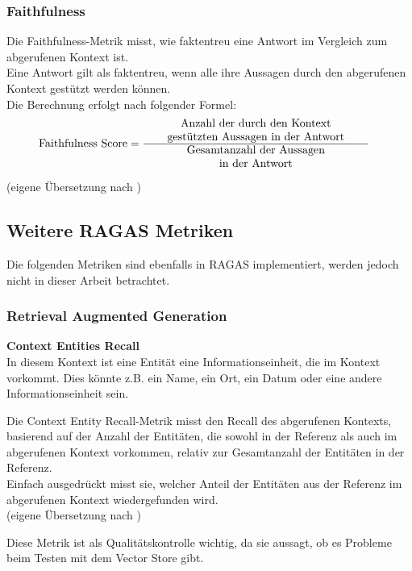 \subsubsection{Faithfulness}
\begin{plainquote}
Die Faithfulness-Metrik misst, wie faktentreu eine Antwort im Vergleich zum abgerufenen Kontext ist.\\

Eine Antwort gilt als faktentreu, wenn alle ihre Aussagen durch den abgerufenen Kontext gestützt werden können.\\

Die Berechnung erfolgt nach folgender Formel:
\begin{align}
  \text{Faithfulness Score}
    &= \frac{
        \parbox{7cm}{\centering Anzahl der durch den Kontext\\ gestützten Aussagen in der Antwort}
      }{
        \parbox{7cm}{\centering Gesamtanzahl der Aussagen\\ in der Antwort}
      }
  \end{align}

(eigene Übersetzung nach \cite{ragas_faithfulness})
\end{plainquote}

\subsection{Weitere RAGAS Metriken}

Die folgenden Metriken sind ebenfalls in RAGAS implementiert, werden jedoch nicht in dieser Arbeit betrachtet.

\subsubsection{Retrieval Augmented Generation}

\textbf{Context Entities Recall}\\
In diesem Kontext ist eine Entität eine Informationseinheit, die im Kontext vorkommt.
Dies könnte z.B. ein Name, ein Ort, ein Datum oder eine andere Informationseinheit sein.

\begin{plainquote}
Die Context Entity Recall-Metrik misst den Recall des abgerufenen Kontexts, basierend auf der Anzahl der Entitäten, die sowohl in der Referenz als auch im abgerufenen Kontext vorkommen, relativ zur Gesamtanzahl der Entitäten in der Referenz.\\
Einfach ausgedrückt misst sie, welcher Anteil der Entitäten aus der Referenz im abgerufenen Kontext wiedergefunden wird.\\
(eigene Übersetzung nach \cite{ragas_context_entities_recall})
\end{plainquote}
Diese Metrik ist als Qualitätskontrolle wichtig, da sie aussagt, ob es Probleme beim Testen mit dem Vector Store gibt.

